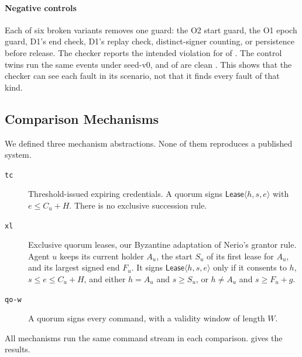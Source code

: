 \paragraph{Negative controls}
Each of six broken variants removes one guard: the O2 start guard, the O1 epoch guard,
D1's end check, D1's replay check, distinct-signer counting, or persistence before
release. The checker reports the intended violation for \SeedNegativeDetected{} of
\SeedNegativeCount{}. The control twins run the same events under seed-v0, and
\SeedControlClean{} of \SeedNegativeCount{} are clean . This shows that the checker can see
each fault in its scenario, not that it finds every fault of that kind.

\subsection{Comparison Mechanisms}
\label{sec:comparisons}

We defined three mechanism abstractions. None of them reproduces a published system.
\begin{description}
  \item[\texttt{tc}] Threshold-issued expiring credentials. A quorum signs
  $\mathsf{Lease}\langle h, s, e\rangle$ with $e \le C_u + H$. There is no exclusive
  succession rule.
  \item[\texttt{xl}] Exclusive quorum leases, our Byzantine adaptation of Nerio's grantor
  rule. Agent $u$ keeps its current holder $A_u$, the start $S_u$ of its first lease for
  $A_u$, and its largest signed end $F_u$. It signs $\mathsf{Lease}\langle h, s, e\rangle$ only if it consents to
  $h$, $s \le e \le C_u + H$, and either $h = A_u$ and $s \ge S_u$, or $h \ne A_u$ and
  $s \ge F_u + g$.
  \item[\texttt{qo-w}] A quorum signs every command, with a validity window of length $W$.
\end{description}
All mechanisms run the same command stream in each comparison. 
gives the results.

\begin{table}[t]
\caption{Comparison runs (one directed run per cell). Handover: time from the old holder's
last acceptance to the new holder's first, or ``overlap'' if the checker found
overlapping holders. After $t_W$: the compromised holder's last acceptance minus $t_W$,
with the candidate bound in brackets. Isolated: how long after the outage started the
latest accepted fresh command was created. Split: whether the old holder keeps service
after a split vote for the same holder, and for two holders.}
\label{tab:comparison}
\centering
\footnotesize
\setlength{\tabcolsep}{2.5pt}

\end{table}

